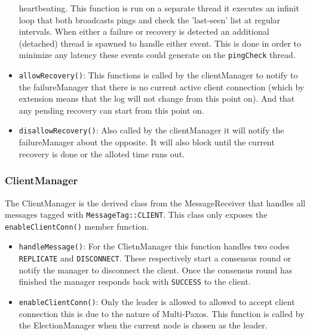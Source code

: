 \documentclass[11pt]{article}
\begin{document}
\begin{itemize}
  heartbeating. This function is run on a separate thread it executes an infinit
  loop that both broadcasts pings and check the 'last-seen' list at regular
  intervals. When either a failure or recovery is detected an additional
  (detached) thread is spawned to handle either event. This is done in order to
  minimize any latency these events could generate on the \texttt{pingCheck}
  thread.\\
\item \texttt{allowRecovery()}: This functions is called by the clientManager to
  notify to the failureManager that there is no current active client connection
  (which by extension means that the log will not change from this point
  on). And that any pending recovery can start from this point on.\\
\item \texttt{disallowRecovery()}: Also called by the clientManager it will
  notify the failureManager about the opposite. It will also block until the
  current recovery is done or the alloted time runs out.
\end{itemize}
\subsubsection{ClientManager}
The ClientManager is the derived class from the MessageReceiver that handles all
messages tagged with \texttt{MessageTag::CLIENT}. This class only exposes the
\texttt{enableClientConn()} member function.\\
\begin{itemize}
  \item \texttt{handleMessage()}: For the ClietnManager this function handles
    two codes \texttt{REPLICATE} and \texttt{DISCONNECT}. These respectively
    start a consensus round or notify the manager to disconnect the client. Once
    the consensus round has finished the manager responds back with
    \texttt{SUCCESS} to the client.\\
  \item \texttt{enableClientConn()}: Only the leader is allowed to allowed to
    accept client connection this is due to the nature of Multi-Paxos. This
    function is called by the ElectionManager when the current node is chosen as
    the leader.\\
\end{itemize}
\end{document}
